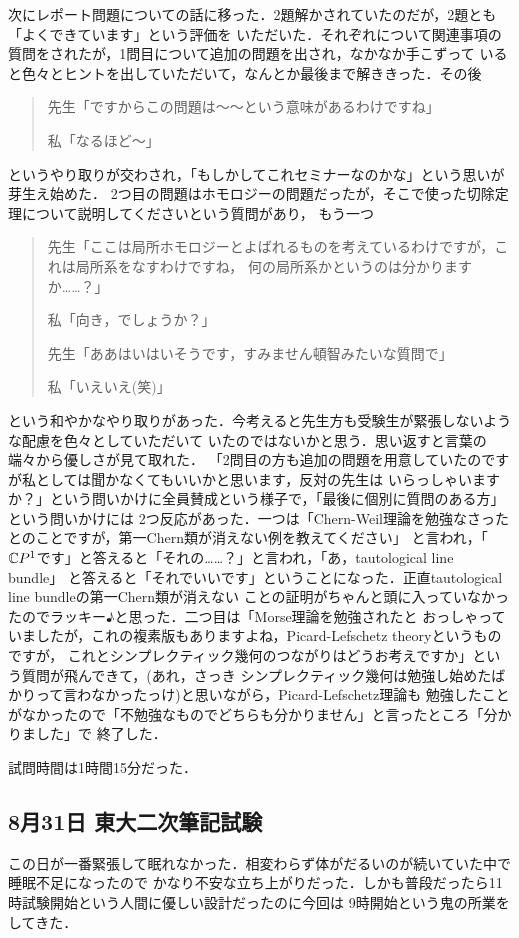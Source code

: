 \documentclass[dvipdfmx,uplatex]{jsarticle}
\begin{document}
次にレポート問題についての話に移った．2題解かされていたのだが，2題とも「よくできています」という評価を
いただいた．それぞれについて関連事項の質問をされたが，1問目について追加の問題を出され，なかなか手こずって
いると色々とヒントを出していただいて，なんとか最後まで解ききった．その後
\begin{quote}
  先生「ですからこの問題は～～という意味があるわけですね」

  私「なるほど～」
\end{quote}
というやり取りが交わされ，「もしかしてこれセミナーなのかな」という思いが芽生え始めた．
2つ目の問題はホモロジーの問題だったが，そこで使った切除定理について説明してくださいという質問があり，
もう一つ
\begin{quote}
  先生「ここは局所ホモロジーとよばれるものを考えているわけですが，これは局所系をなすわけですね，
  何の局所系かというのは分かりますか……？」

  私「向き，でしょうか？」

  先生「ああはいはいそうです，すみません頓智みたいな質問で」

  私「いえいえ(笑)」
\end{quote}
という和やかなやり取りがあった．今考えると先生方も受験生が緊張しないような配慮を色々としていただいて
いたのではないかと思う．思い返すと言葉の端々から優しさが見て取れた．
「2問目の方も追加の問題を用意していたのですが私としては聞かなくてもいいかと思います，反対の先生は
いらっしゃいますか？」という問いかけに全員賛成という様子で，「最後に個別に質問のある方」という問いかけには
2つ反応があった．一つは「Chern-Weil理論を勉強なさったとのことですが，第一Chern類が消えない例を教えてください」
と言われ，「$\mathbb{C} P^1$です」と答えると「それの……？」と言われ，「あ，tautological line bundle」
と答えると「それでいいです」ということになった．正直tautological line bundleの第一Chern類が消えない
ことの証明がちゃんと頭に入っていなかったのでラッキー♪と思った．二つ目は「Morse理論を勉強されたと
おっしゃっていましたが，これの複素版もありますよね，Picard-Lefschetz theoryというものですが，
これとシンプレクティック幾何のつながりはどうお考えですか」という質問が飛んできて，(あれ，さっき
シンプレクティック幾何は勉強し始めたばかりって言わなかったっけ)と思いながら，Picard-Lefschetz理論も
勉強したことがなかったので「不勉強なものでどちらも分かりません」と言ったところ「分かりました」で
終了した．

試問時間は1時間15分だった．

\subsection{8月31日 東大二次筆記試験}
この日が一番緊張して眠れなかった．相変わらず体がだるいのが続いていた中で睡眠不足になったので
かなり不安な立ち上がりだった．しかも普段だったら11時試験開始という人間に優しい設計だったのに今回は
9時開始という鬼の所業をしてきた．
\end{document}
